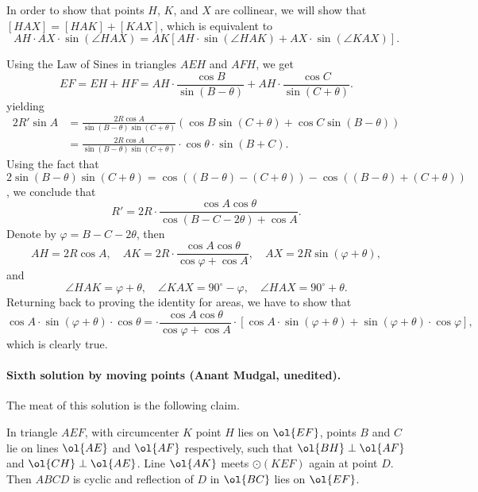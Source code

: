 In order to show that points $H$, $K$, and $X$ are collinear, we will show that $[HAX] = [HAK] + [KAX]$,
which is equivalent to
\[
AH  \cdot AX \cdot \sin (\angle HAX) = AK \left [AH \cdot \sin (\angle HAK) + AX \cdot \sin (\angle KAX)\right].
\]

Using the Law of Sines in triangles $AEH$ and $AFH$, we get
\[
EF = EH + HF =  AH \cdot \frac{\cos B}{\sin (B -\theta) }+AH \cdot \frac{\cos C}{\sin (C +\theta)}.
\]
yielding
\begin{align*}
2R' \sin A &= \frac{2R \cos A}{\sin (B -\theta) \sin (C+\theta)} \left (\cos B \sin (C +\theta) + \cos C \sin (B-\theta)\right)\\
&=  \frac{2R \cos A}{\sin (B -\theta) \sin (C+\theta)} \cdot \cos \theta \cdot \sin (B+C).
\end{align*}
Using the fact that $2\sin (B -\theta) \sin (C+\theta) = \cos ((B -\theta)-(C+\theta))  - \cos ((B -\theta)+(C+\theta))$,
we conclude that
\[
R' = 2R\cdot \frac{\cos A \cos \theta }{ \cos (B -C-2\theta) + \cos A}.
\]
Denote by $\varphi  = B -C-2\theta$, then
\[
AH =  2R \cos A, \quad AK=  2R\cdot \frac{\cos A \cos \theta }{ \cos \varphi + \cos A}, \quad  AX = 2R \sin (\varphi+ \theta),
\]
and
\[\angle HAK = \varphi+ \theta, \quad \angle KAX = 90^{\circ}-\varphi, \quad \angle HAX = 90^{\circ}+\theta.
\]
Returning back to proving the identity for areas, we have to show that
\[
\cos A  \cdot \sin (\varphi + \theta) \cdot \cos \theta   = \cdot \frac{\cos A \cos \theta }{ \cos \varphi + \cos A} \cdot
\left [ \cos A \cdot \sin (\varphi+ \theta) + \sin (\varphi+ \theta) \cdot \cos \varphi\right ],
\]
which is clearly true.


\paragraph{Sixth solution by moving points (Anant Mudgal, unedited).}
The meat of this solution is the following claim.
\begin{claim*}
In triangle $AEF$, with circumcenter $K$ point $H$ lies on $\ol{EF}$, points $B$ and $C$ lie on lines $\ol{AE}$ and $\ol{AF}$ respectively, such that $\ol{BH} \perp \ol{AF}$ and $\ol{CH} \perp \ol{AE}$. Line $\ol{AK}$ meets $\odot(KEF)$ again at point $D$. Then $ABCD$ is cyclic and reflection of $D$ in $\ol{BC}$ lies on $\ol{EF}$.
\end{claim*}

